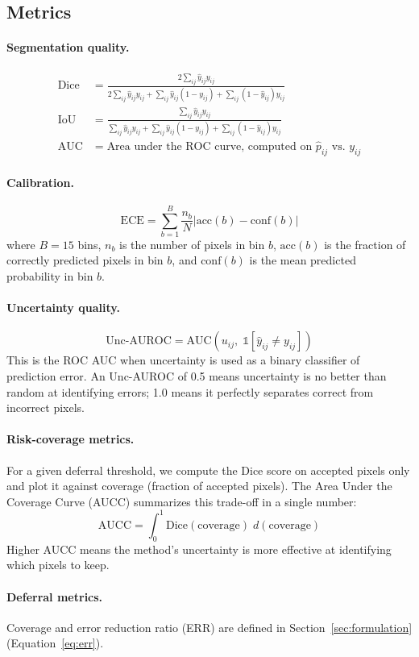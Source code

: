 \subsection{Metrics}

\paragraph{Segmentation quality.}
\begin{align}
  \text{Dice} &= \frac{2 \sum_{ij} \hat{y}_{ij} y_{ij}}
  {2\sum_{ij} \hat{y}_{ij} y_{ij} + \sum_{ij} \hat{y}_{ij}(1 - y_{ij}) +
  \sum_{ij} (1 - \hat{y}_{ij}) y_{ij}}
  \label{eq:dice} \\
  \text{IoU} &= \frac{\sum_{ij} \hat{y}_{ij} y_{ij}}
  {\sum_{ij} \hat{y}_{ij} y_{ij} + \sum_{ij} \hat{y}_{ij}(1 - y_{ij}) +
  \sum_{ij} (1 - \hat{y}_{ij}) y_{ij}}
  \label{eq:iou} \\
  \text{AUC} &= \text{Area under the ROC curve, computed on } \hat{p}_{ij}
  \text{ vs.\ } y_{ij}
  \label{eq:auc}
\end{align}

\paragraph{Calibration.}
\begin{equation}
  \text{ECE} = \sum_{b=1}^{B} \frac{n_b}{N}
  \left| \text{acc}(b) - \text{conf}(b) \right|
  \label{eq:ece}
\end{equation}
where $B = 15$ bins, $n_b$ is the number of pixels in bin $b$,
$\text{acc}(b)$ is the fraction of correctly predicted pixels in bin $b$,
and $\text{conf}(b)$ is the mean predicted probability in bin $b$.

\paragraph{Uncertainty quality.}
\begin{equation}
  \text{Unc-AUROC} = \text{AUC}(u_{ij}, \; \mathbb{1}[\hat{y}_{ij} \neq y_{ij}])
  \label{eq:unc_auroc}
\end{equation}
This is the ROC AUC when uncertainty is used as a binary classifier of
prediction error. An Unc-AUROC of 0.5 means uncertainty is no better than
random at identifying errors; 1.0 means it perfectly separates correct from
incorrect pixels.

\paragraph{Risk-coverage metrics.} For a given deferral threshold, we compute
the Dice score on accepted pixels only and plot it against coverage (fraction
of accepted pixels). The Area Under the Coverage Curve (AUCC) summarizes this
trade-off in a single number:
\begin{equation}
  \text{AUCC} = \int_0^1 \text{Dice}(\text{coverage}) \; d(\text{coverage})
  \label{eq:aucc}
\end{equation}
Higher AUCC means the method's uncertainty is more effective at identifying
which pixels to keep.

\paragraph{Deferral metrics.} Coverage and error reduction ratio (ERR) are
defined in Section~\ref{sec:formulation} (Equation~\ref{eq:err}).
